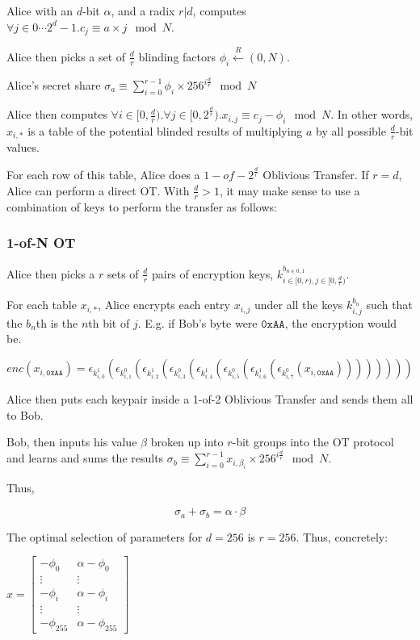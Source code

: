 \documentclass{article}
\begin{document}
Alice with an $d$-bit $\alpha$, and a radix $r | d$, computes $\forall j \in 0\cdots 2^d -1. c_j \equiv  a \times j \mod N$.

Alice then picks a set of $\frac{d}{r}$ blinding factors $\phi_i \xleftarrow{R} (0, N)$.

Alice's secret share $\sigma_a \equiv \sum\limits_{i=0}^{r-1} \phi_i \times 256^{i\frac{d}{r}} \mod N$

Alice then computes $\forall i \in [0, \frac{d}{r}). \forall j \in [0, 2^{\frac{d}{r}}). x_{i, j} \equiv c_j - \phi_i \mod N$. In other words, $x_{i,*}$ is a table of the potential blinded results of multiplying $a$ by all possible $\frac{d}{r}$-bit values.

For each row of this table, Alice does a $1-of-2^\frac{d}{r}$ Oblivious Transfer. 
If $r = d$, Alice can perform a direct OT. With $\frac{d}{r} > 1$, it may make sense to use a combination of keys to perform the transfer as follows:

\subsubsection{1-of-N OT}
Alice then picks a $r$ sets of $\frac{d}{r}$ pairs of encryption keys, $k^{b_{n\in {0,1}}}_{i\in [0,r),j \in [0,\frac{d}{r})}$.

For each table $x_{i, *}$, Alice encrypts each entry $x_{i,j}$ under all the keys $k^{b_n}_{i,j}$ such that the $b_n$th is the $n$th bit of $j$. E.g. if Bob's byte were $\texttt{0xAA}$, the encryption would be. 

$$enc(x_{i, \texttt{0xAA}}) = 
\epsilon_{k^{1}_{i,0}}(\epsilon_{k^{0}_{i,1}}(\epsilon_{k^{1}_{i,2}}(\epsilon_{k^{0}_{i,3}}(\epsilon_{k^{1}_{i,4}}(\epsilon_{k^{0}_{i,5}}(\epsilon_{k^{1}_{i,6}}(\epsilon_{k^{0}_{i,7}}(x_{i,\texttt{0xAA}}))))))))
$$

Alice then puts each keypair inside a 1-of-2 Oblivious Transfer and sends them all to Bob.


Bob, then inputs his value $\beta$ broken up into $r$-bit groups into the OT protocol and learns and sums the results $\sigma_b \equiv \sum\limits_{i=0}^{r-1} x_{i, \beta_i} \times 256^{i\frac{d}{r}} \mod N$.

Thus,

$$\sigma_a + \sigma_b = \alpha \cdot \beta$$


The optimal selection of parameters for $d=256$ is $r=256$. Thus, concretely:

$x =\begin{bmatrix}
-\phi_0 & \alpha - \phi_0 \\
\vdots & \vdots \\
-\phi_i & \alpha - \phi_i \\
\vdots & \vdots \\
-\phi_{255} & \alpha - \phi_{255}
\end{bmatrix}$
\end{document}
